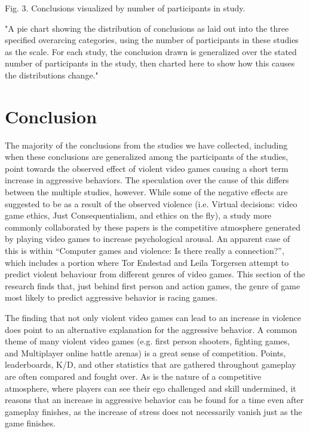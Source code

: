 \documentclass[11pt]{article}
\begin{document}

\centerline{Fig. 3. Conclusions visualized by number of participants in study.}
\begin{adjustwidth}{1in}{1in}
\small{"A pie chart showing the distribution of conclusions as laid out into the three specified overarcing categories, using the number of participants in these studies as the scale. For each study, the conclusion drawn is generalized over the stated number of participants in the study, then charted here to show how this causes the distributions change."}
\end{adjustwidth}

\section{Conclusion}

The majority of the conclusions from the studies we have collected, including when these conclusions are generalized among the participants of the studies, point towards the observed effect of violent video games causing a short term increase in aggressive behaviors. The speculation over the cause of this differs between the multiple studies, however. While some of the negative effects are suggested to be as a result of the observed violence (i.e. Virtual decisions: video game ethics, Just Consequentialism, and ethics on the fly), a study more commonly collaborated by these papers is the competitive atmosphere generated by playing video games to increase psychological arousal. An apparent case of this is within “Computer games and violence: Is there really a connection?”, which includes a portion where Tor Endestad and Leila Torgersen attempt to predict violent behaviour from different genres of video games. This section of the research finds that, just behind first person and action games, the genre of game most likely to predict aggressive behavior is racing games.

The finding that not only violent video games can lead to an increase in violence does point to an alternative explanation for the aggressive behavior. A common theme of many violent video games (e.g. first person shooters, fighting games, and Multiplayer online battle arenas) is a great sense of competition. Points, leaderboards, K/D, and other statistics that are gathered throughout gameplay are often compared and fought over. As is the nature of a competitive atmosphere, where players can see their ego challenged and skill undermined, it reasons that an increase in aggressive behavior can be found for a time even after gameplay finishes, as the increase of stress does not necessarily vanish just as the game finishes.
\end{document}
